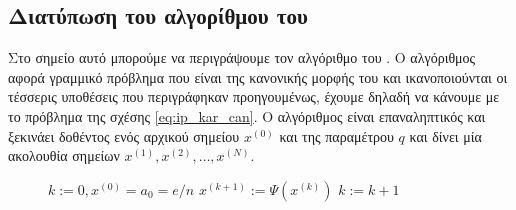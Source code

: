 \subsection{Διατύπωση του αλγορίθμου του }
Στο σημείο αυτό μπορούμε να περιγράψουμε τον αλγόριθμο του . Ο
αλγόριθμος αφορά γραμμικό πρόβλημα που είναι της κανονικής μορφής του
 και  ικανοποιούνται οι τέσσερις υποθέσεις που περιγράφηκαν
προηγουμένως, έχουμε δηλαδή να κάνουμε με το πρόβλημα της σχέσης
\eqref{eq:ip_kar_can}. Ο αλγόριθμος είναι επαναληπτικός και ξεκινάει δοθέντος
ενός αρχικού σημείου \(x^{(0)}\) και της παραμέτρου \( q\) και δίνει μία
ακολουθία σημείων \( x^{(1)}, x^{(2)}, \dots, x^{(N)} \).
\begin{figure}[h]
    \begin{otherlanguage}{english}
        \begin{algorithmic}
            \REQUIRE {}
            \(k := 0, x^{(0)} = a_0 = e/n\)
            \REPEAT
            \STATE {}
            \(x^{(k+1)} := \Psi(x^{(k)})\)
            \STATE {}
            \(k := k + 1\)
        \end{algorithmic}
    \end{otherlanguage}
    \caption{}
    \label{alg:ip_kar}
\end{figure}

